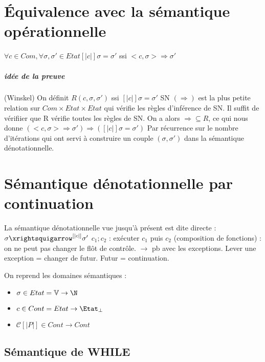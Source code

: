 \documentclass[10pt,a4paper]{article}
\newcommand{\semm}[1]{\left[| #1 | \right]}
\newcommand{\V}{\mathbb{V}}
\begin{document}
\section{Équivalence avec la sémantique opérationnelle}
\begin{thm}{} $\forall c \in Com, \forall \sigma, \sigma' \in Etat
\semm{c} \sigma = \sigma'$ ssi $<c, \sigma> \Rightarrow \sigma'$
\end{thm}
\subparagraph{idée de la preuve}(Winskel)
\circled{$\Leftarrow$} On définit $R(c, \sigma, \sigma')$ ssi $\semm{c} \sigma = \sigma'$
SN $(\Rightarrow)$ est la plus petite relation sur $Com \times Etat \times Etat$ qui vérifie les règles d'inférence de SN.
Il suffit de vérifiier que R vérifie toutes les règles de SN.
On a alors $\Rightarrow \subseteq R$, ce qui nous donne $(<c, \sigma> \Rightarrow \sigma') \Longrightarrow (\semm{c} \sigma = \sigma')$
\circled{$\Rightarrow$} Par récurrence sur le nombre d'itérations qui ont servi à construire un couple $(\sigma, \sigma')$ dans la sémantique dénotationnelle.


\section{Sémantique dénotationnelle par continuation}

La sémantique dénotationnelle vue jusqu'à présent est dite directe : $ \sigma \xrightsquigarrow^{\semm{c}} \sigma'$
$c_1;c_2$ : exécuter $c_1$ puis $c_2$ (composition de fonctions) : on ne peut pas changer le flôt de contrôle.
$\longrightarrow $ pb avec les exceptions.
Lever une exception = changer de futur.
Futur = continuation.

On reprend les domaines sémantiques : 
\begin{itemize}
 \item $\sigma \in Etat = \V \to \N$
 \item $c \in Cont = Etat \to \Etat_{\perp}$
 \item $\mathcal{C} \semm{P} \in Cont \to Cont$
\end{itemize}

\subsection{Sémantique de WHILE}
\end{document}
